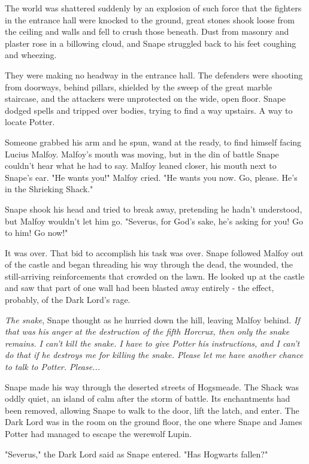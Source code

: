 \documentclass[a4paper,11pt]{article}
\begin{document}
The world was shattered suddenly by an explosion of such force that the fighters in the entrance hall were knocked to the ground, great stones shook loose from the ceiling and walls and fell to crush those beneath. Dust from masonry and plaster rose in a billowing cloud, and Snape struggled back to his feet coughing and wheezing.

They were making no headway in the entrance hall. The defenders were shooting from doorways, behind pillars, shielded by the sweep of the great marble staircase, and the attackers were unprotected on the wide, open floor. Snape dodged spells and tripped over bodies, trying to find a way upstairs. A way to locate Potter.

Someone grabbed his arm and he spun, wand at the ready, to find himself facing Lucius Malfoy. Malfoy's mouth was moving, but in the din of battle Snape couldn't hear what he had to say. Malfoy leaned closer, his mouth next to Snape's ear. "He wants you!" Malfoy cried. "He wants you now. Go, please. He's in the Shrieking Shack."

Snape shook his head and tried to break away, pretending he hadn't understood, but Malfoy wouldn't let him go. "Severus, for God's sake, he's asking for you! Go to him! Go now!"

It was over. That bid to accomplish his task was over. Snape followed Malfoy out of the castle and began threading his way through the dead, the wounded, the still-arriving reinforcements that crowded on the lawn. He looked up at the castle and saw that part of one wall had been blasted away entirely - the effect, probably, of the Dark Lord's rage.

\emph{The snake}, Snape thought as he hurried down the hill, leaving Malfoy behind. \emph{If that was his anger at the destruction of the fifth Horcrux, then only the snake remains. I can't kill the snake. I have to give Potter his instructions, and I can't do that if he destroys me for killing the snake. Please let me have another chance to talk to Potter. Please...}

Snape made his way through the deserted streets of Hogsmeade. The Shack was oddly quiet, an island of calm after the storm of battle. Its enchantments had been removed, allowing Snape to walk to the door, lift the latch, and enter. The Dark Lord was in the room on the ground floor, the one where Snape and James Potter had managed to escape the werewolf Lupin.

"Severus," the Dark Lord said as Snape entered. "Has Hogwarts fallen?"
\end{document}

